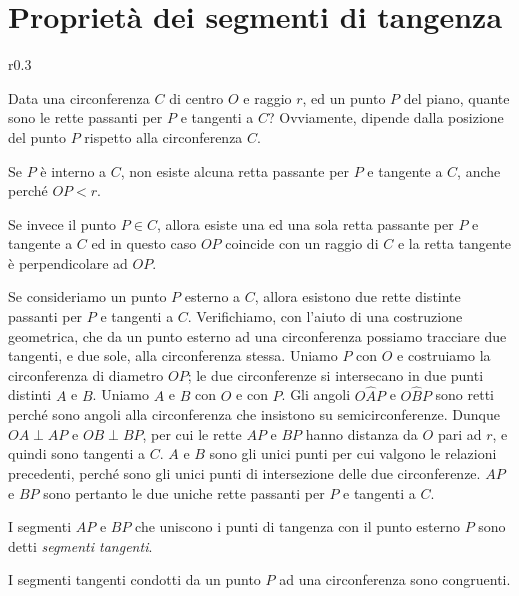 \section{Proprietà dei segmenti di 
tangenza}\label{sect:proprieta_tangenti}

\begin{wrapfigure}{r}{0.3\textwidth}
	
\centering\vspace{20pt}
\end{wrapfigure}
Data una circonferenza \(C\) di centro \(O\) e raggio \(r\), ed un punto 
\(P\) del piano, quante sono le rette passanti per \(P\) e tangenti a \(C\)? 
 Ovviamente, dipende dalla posizione del punto \(P\) rispetto alla 
circonferenza \(C\).

Se \(P\) è interno a \(C\), non esiste alcuna retta passante per \(P\) e 
tangente a \(C\), anche perché \(OP < r\).

Se invece il punto \(P\in C\), allora esiste una ed una sola retta 
passante per \(P\) e tangente a \(C\) ed in questo caso \(OP\) coincide con 
un raggio di \(C\) e la retta tangente è perpendicolare ad \(OP\).

Se consideriamo un punto \(P\) esterno a \(C\), allora esistono due rette 
distinte passanti per \(P\) e tangenti a \(C\). Verifichiamo, con l'aiuto 
di una costruzione geometrica, che da un punto esterno ad una 
circonferenza possiamo tracciare due tangenti, e due sole, alla 
circonferenza stessa.
Uniamo \(P\) con \(O\) e costruiamo la circonferenza di diametro \(OP\); le 
due circonferenze si intersecano in due punti distinti \(A\) e \(B\). 
Uniamo \(A\) e \(B\) con \(O\) e con \(P\). Gli angoli \(O\widehat{A}P\) e 
\(O\widehat{B}P\) sono retti perché sono angoli alla circonferenza che 
insistono su semicirconferenze. Dunque \(OA\perp AP\) e \(OB\perp BP\), 
per cui le rette \(AP\) e \(BP\) hanno distanza da \(O\) pari ad \(r\), e 
quindi sono tangenti a \(C\). \(A\) e \(B\) sono gli unici punti per cui 
valgono le relazioni precedenti, perché sono gli unici punti di 
intersezione delle due circonferenze. \(AP\) e \(BP\) sono pertanto le 
due uniche rette passanti per \(P\) e tangenti a \(C\).

I segmenti \(AP\) e \(BP\) che uniscono i punti di tangenza con il punto 
esterno \(P\) sono detti \emph{segmenti tangenti}.

\begin{teorema}
I segmenti tangenti condotti da un punto \(P\) ad una circonferenza 
sono congruenti.
\end{teorema}

